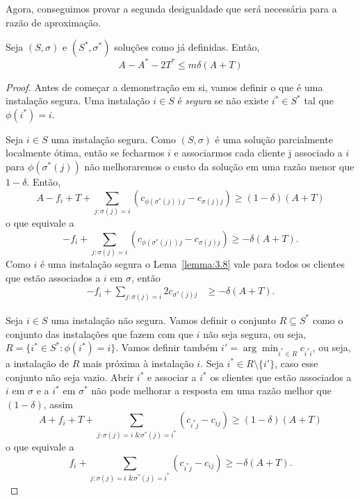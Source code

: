 Agora, conseguimos provar a segunda desigualdade que será necessária para a razão de aproximação.
\begin{lemma}
    \label{lema:3.9}
    Seja $(S,\sigma)$ e $(S^*,\sigma^*)$ soluções como já definidas. Então,
    \[A - A^* - 2T^* \leq m \delta(A+T)\]
\end{lemma}
\begin{proof}
    Antes de começar a demonstração em si, vamos definir o que é uma instalação segura. Uma instalação $i \in S$ é \emph{segura} se não existe $i^* \in S^*$ tal que $\phi(i^*)=i$.

    Seja $i \in S$ uma instalação segura. Como $(S,\sigma)$ é uma solução parcialmente localmente ótima, então se fecharmos $i$ e associarmos cada cliente j associado a $i$ para $\phi(\sigma^*(j))$ não melhoraremos o custo da solução em uma razão menor que $1-\delta$. Então,
    \[
        A - f_i + T + \sum_{j:\sigma(j) = i} (c_{\phi(\sigma^*(j))j} - c_{\sigma(j)j}) \geq (1-\delta)(A+T)\]
        o que equivale a 
        \[
        - f_i + \sum_{j:\sigma(j) = i} (c_{\phi(\sigma^*(j))j} - c_{\sigma(j)j}) \geq -\delta(A+T).
        \]
    Como $i$ é uma instalação segura o Lema~\ref{lemma:3.8} vale para todos os clientes que estão associados a $i$ em $\sigma$, então
    \begin{align} 
        \label{segura}
        - f_i + \sum_{j:\sigma(j) = i} 2c_{\sigma^*(j)j} &\geq -\delta(A+T).
    \end{align}

    Seja $i\in S$ uma instalação não segura. Vamos definir o conjunto $R \subseteq S^*$ como o conjunto das instalações que fazem com que $i$ não seja segura, ou seja, $R = \{i^* \in S^* : \phi(i^*) = i\}$. Vamos definir também $i' = \arg\min_{i^* \in R} c_{i^*i}$, ou seja, a instalação de $R$ mais próxima à instalação $i$.
    Seja $i^* \in R\setminus\{i'\}$, caso esse conjunto não seja vazio. Abrir $i^*$ e associar a $i^*$ os clientes que estão associados a $i$ em $\sigma $ e a $i^*$ em $\sigma^*$ não pode melhorar a resposta em uma razão melhor que $(1-\delta)$, assim
    \[
        A + f_i + T + \sum_{j: \sigma(j) = i \text{ \& } \sigma^*(j) = i^*}(c_{i^*j} - c_{ij})\geq (1-\delta)(A+T)\]
    o que equivale a 
        \begin{equation}
        \label{não segura}
        f_i + \sum_{j: \sigma(j) = i \text{ \& } \sigma^*(j) = i^*}(c_{i^*j} - c_{ij}) \geq -\delta(A+T).        
    \end{equation}    


\end{proof}
